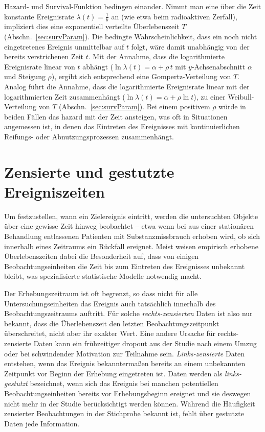 Hazard- und Survival-Funktion bedingen einander. Nimmt man eine über die Zeit konstante Ereignisrate $\lambda(t) = \frac{1}{b}$ an (wie etwa beim radioaktiven Zerfall), impliziert dies eine exponentiell verteilte Überlebenszeit $T$ (Abschn.\ \ref{sec:survParam}). Die bedingte Wahrscheinlichkeit, dass ein noch nicht eingetretenes Ereignis unmittelbar auf $t$ folgt, wäre damit unabhängig von der bereits verstrichenen Zeit $t$. Mit der Annahme, dass die logarithmierte Ereignisrate linear von $t$ abhängt ($\ln \lambda(t) = \alpha + \rho \, t$ mit $y$-Achsenabschnitt $\alpha$ und Steigung $\rho$), ergibt sich entsprechend eine Gompertz-Verteilung von $T$. Analog führt die Annahme, dass die logarithmierte Ereignisrate linear mit der logarithmierten Zeit zusammenhängt ($\ln \lambda(t) = \alpha + \rho \ln t$), zu einer Weibull-Verteilung von $T$ (Abschn.\ \ref{sec:survParam}). Bei einem positivem $\rho$ würde in beiden Fällen das hazard mit der Zeit ansteigen, was oft in Situationen angemessen ist, in denen das Eintreten des Ereignisses mit kontinuierlichen Reifungs- oder Abnutzungsprozessen zusammenhängt.

\section{Zensierte und gestutzte Ereigniszeiten}
\label{sec:survData}

Um festzustellen, wann ein Zielereignis eintritt, werden die untersuchten Objekte über eine gewisse Zeit hinweg beobachtet -- etwa wenn bei aus einer stationären Behandlung entlassenen Patienten mit Substanzmissbrauch erhoben wird, ob sich innerhalb eines Zeitraums ein Rückfall ereignet. Meist weisen empirisch erhobene Überlebenszeiten dabei die Besonderheit auf, dass von einigen Beobachtungseinheiten die Zeit bis zum Eintreten des Ereignisses unbekannt bleibt, was spezialisierte statistische Modelle notwendig macht.

Der Erhebungszeitraum ist oft begrenzt, so dass nicht für alle Untersuchungseinheiten das Ereignis auch tatsächlich innerhalb des Beobachtungszeitraums auftritt. Für solche \emph{rechts-zensierten} Daten ist also nur bekannt, dass die Überlebenszeit den letzten Beobachtungszeitpunkt überschreitet, nicht aber ihr exakter Wert. Eine andere Ursache für rechts-zensierte Daten kann ein frühzeitiger dropout aus der Studie nach einem Umzug oder bei schwindender Motivation zur Teilnahme sein. \emph{Links-zensierte} Daten entstehen, wenn das Ereignis bekanntermaßen bereits an einem unbekannten Zeitpunkt vor Beginn der Erhebung eingetreten ist. Daten werden als \emph{links-gestutzt} bezeichnet, wenn sich das Ereignis bei manchen potentiellen Beobachtungseinheiten bereits vor Erhebungsbeginn ereignet und sie deswegen nicht mehr in der Studie berücksichtigt werden können. Während die Häufigkeit zensierter Beobachtungen in der Stichprobe bekannt ist, fehlt über gestutzte Daten jede Information.

